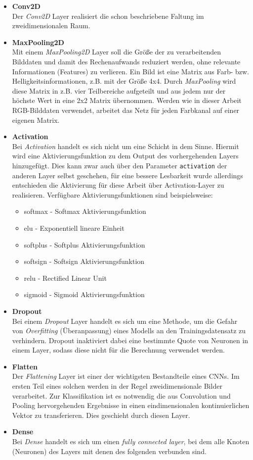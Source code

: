 \begin{itemize}
	\item \textbf{Conv2D}\\
	Der \textit{Conv2D} Layer realisiert die schon beschriebene Faltung im zweidimensionalen Raum.
	\item \textbf{MaxPooling2D} \\
	Mit einem \textit{MaxPooling2D} Layer soll die Größe der zu verarbeitenden Bilddaten und damit des Rechenaufwands reduziert werden, ohne relevante Informationen (Features) zu verlieren. Ein Bild ist eine Matrix aus Farb- bzw. Helligkeitsinformationen, z.B. mit der Größe 4x4. Durch \textit{MaxPooling} wird diese Matrix in z.B. vier Teilbereiche aufgeteilt und aus jedem nur der höchste Wert in eine 2x2 Matrix übernommen. Werden wie in dieser Arbeit RGB-Bilddaten verwendet, arbeitet das Netz für jeden Farbkanal auf einer eigenen Matrix.
	\item \textbf{Activation} \\
	Bei \textit{Activation} handelt es sich nicht um eine Schicht in dem Sinne. Hiermit wird eine Aktivierungsfunktion zu dem Output des vorhergehenden Layers hinzugefügt. Dies kann zwar auch über den Parameter \texttt{activation} der anderen Layer selbst geschehen, für eine bessere Lesbarkeit wurde allerdings entschieden die Aktivierung für diese Arbeit über Activation-Layer zu realisieren. Verfügbare Aktivierungsfunktionen sind beispielsweise: \begin{itemize}
		\item softmax - Softmax Aktivierungsfunktion
		\item elu - Exponentiell lineare Einheit
		\item softplus - Softplus Aktivierungsfunktion
		\item softsign - Softsign Aktivierungsfunktion
		\item relu - Rectified Linear Unit
		\item sigmoid - Sigmoid Aktivierungsfunktion		
	\end{itemize}
	\item \textbf{Dropout} \\
	Bei einem \textit{Dropout} Layer handelt es sich um eine Methode, um die Gefahr von \textit{Overfitting} (Überanpassung) eines Modells an den Trainingsdatensatz zu verhindern. Dropout inaktiviert dabei eine bestimmte Quote von Neuronen in einem Layer, sodass diese nicht für die Berechnung verwendet werden.
	\item \textbf{Flatten}\\
	Der \textit{Flattening} Layer ist einer der wichtigsten Bestandteile eines CNNs. Im ersten Teil eines solchen werden in der Regel zweidimensionale Bilder verarbeitet. Zur Klassifikation ist es notwendig die aus Convolution und Pooling hervorgehenden Ergebnisse in einen eindimensionalen kontinuierlichen Vektor zu transferieren. Dies geschieht durch diesen Layer. 
	\item \textbf{Dense} \\
	Bei \textit{Dense} handelt es sich um einen \textit{fully connected layer}, bei dem alle Knoten (Neuronen) des Layers mit denen des folgenden verbunden sind. 
	
\end{itemize}
